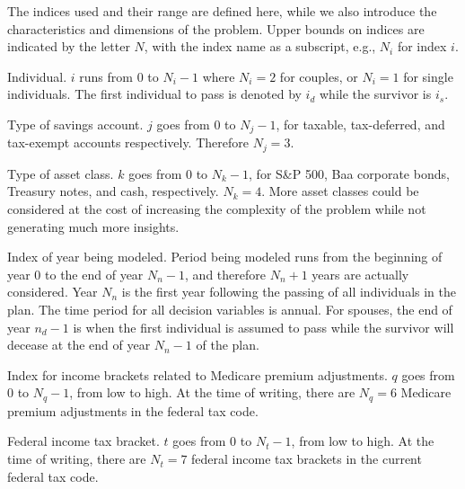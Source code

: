 \documentclass{report}[fleqn,11pt]
\begin{document}
The indices used and their range are defined here, while we also
introduce the characteristics and dimensions of the problem.
Upper bounds on indices are indicated by the letter $N$, with the
index name as a subscript, e.g., $N_i$ for index $i$.
\begin{description}[leftmargin=4em,style=multiline]
\item [$i$]
	Individual. $i$ runs from 0 to $N_i - 1$ where $N_i = 2$ for couples,
	or $N_i= 1$ for single individuals. The first individual to pass
		is denoted by $i_d$ while the survivor is $i_s$.
\item [$j$]
	Type of savings account. $j$ goes from 0 to $N_j - 1$, for taxable, tax-deferred,
	and tax-exempt accounts respectively. Therefore $N_j = 3$.
\item[$k$]
	Type of asset class. $k$ goes from 0 to $N_k -1 $, for S\&P 500,
	Baa corporate bonds, Treasury notes, and cash, respectively. $N_k = 4$.
	More asset classes could be considered at the cost of increasing
	the complexity of the problem while not generating much more insights.
\item [$n$]
	Index of year being modeled. Period being modeled runs from the beginning of year 0 to 
	the end of year $N_n-1$, and therefore $N_n + 1$ years are actually considered.
	Year $N_n$ is the first year following the passing of all
	individuals in the plan. The time period for all decision variables is annual.
	For spouses, the end of year $n_d-1$ is when the first individual is assumed to pass while
	the survivor will decease at the end of year $N_n-1$ of the plan.
\item [$q$]
	Index for income brackets related to Medicare premium adjustments.
	$q$ goes from 0 to $N_q - 1$, from low to high.
	At the time of writing, there are $N_q = 6$ Medicare premium adjustments in the federal tax code.
\item [$t$]
	Federal income tax bracket. $t$ goes from 0 to $N_t - 1$, from low to high.
	At the time of writing, there are $N_t = 7$ federal income tax brackets in the current federal tax code.
\end{description}
\end{document}
